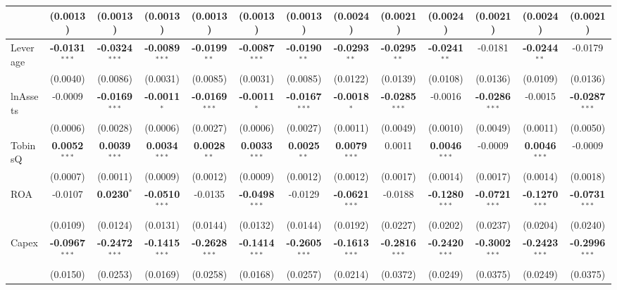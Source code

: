 \documentclass[11pt,a4paper]{article}
\begin{document}
\begin{table}[htbp]
\begin{tabular}{lcccccccccccc}
 & (0.0013) & (0.0013) & (0.0013) & (0.0013) & (0.0013) & (0.0013) & (0.0024) & (0.0021) & (0.0024) & (0.0021) & (0.0024) & (0.0021) \\
\midrule
Leverage & \textbf{-0.0131}$^{***}$ & \textbf{-0.0324}$^{***}$ & \textbf{-0.0089}$^{***}$ & \textbf{-0.0199}$^{**}$ & \textbf{-0.0087}$^{***}$ & \textbf{-0.0190}$^{**}$ & \textbf{-0.0293}$^{**}$ & \textbf{-0.0295}$^{**}$ & \textbf{-0.0241}$^{**}$ & -0.0181 & \textbf{-0.0244}$^{**}$ & -0.0179 \\
 & (0.0040) & (0.0086) & (0.0031) & (0.0085) & (0.0031) & (0.0085) & (0.0122) & (0.0139) & (0.0108) & (0.0136) & (0.0109) & (0.0136) \\
lnAssets & -0.0009 & \textbf{-0.0169}$^{***}$ & \textbf{-0.0011}$^{*}$ & \textbf{-0.0169}$^{***}$ & \textbf{-0.0011}$^{*}$ & \textbf{-0.0167}$^{***}$ & \textbf{-0.0018}$^{*}$ & \textbf{-0.0285}$^{***}$ & -0.0016 & \textbf{-0.0286}$^{***}$ & -0.0015 & \textbf{-0.0287}$^{***}$ \\
 & (0.0006) & (0.0028) & (0.0006) & (0.0027) & (0.0006) & (0.0027) & (0.0011) & (0.0049) & (0.0010) & (0.0049) & (0.0011) & (0.0050) \\
TobinsQ & \textbf{0.0052}$^{***}$ & \textbf{0.0039}$^{***}$ & \textbf{0.0034}$^{***}$ & \textbf{0.0028}$^{**}$ & \textbf{0.0033}$^{***}$ & \textbf{0.0025}$^{**}$ & \textbf{0.0079}$^{***}$ & 0.0011 & \textbf{0.0046}$^{***}$ & -0.0009 & \textbf{0.0046}$^{***}$ & -0.0009 \\
 & (0.0007) & (0.0011) & (0.0009) & (0.0012) & (0.0009) & (0.0012) & (0.0012) & (0.0017) & (0.0014) & (0.0017) & (0.0014) & (0.0018) \\
ROA & -0.0107 & \textbf{0.0230}$^{*}$ & \textbf{-0.0510}$^{***}$ & -0.0135 & \textbf{-0.0498}$^{***}$ & -0.0129 & \textbf{-0.0621}$^{***}$ & -0.0188 & \textbf{-0.1280}$^{***}$ & \textbf{-0.0721}$^{***}$ & \textbf{-0.1270}$^{***}$ & \textbf{-0.0731}$^{***}$ \\
 & (0.0109) & (0.0124) & (0.0131) & (0.0144) & (0.0132) & (0.0144) & (0.0192) & (0.0227) & (0.0202) & (0.0237) & (0.0204) & (0.0240) \\
Capex & \textbf{-0.0967}$^{***}$ & \textbf{-0.2472}$^{***}$ & \textbf{-0.1415}$^{***}$ & \textbf{-0.2628}$^{***}$ & \textbf{-0.1414}$^{***}$ & \textbf{-0.2605}$^{***}$ & \textbf{-0.1613}$^{***}$ & \textbf{-0.2816}$^{***}$ & \textbf{-0.2420}$^{***}$ & \textbf{-0.3002}$^{***}$ & \textbf{-0.2423}$^{***}$ & \textbf{-0.2996}$^{***}$ \\
 & (0.0150) & (0.0253) & (0.0169) & (0.0258) & (0.0168) & (0.0257) & (0.0214) & (0.0372) & (0.0249) & (0.0375) & (0.0249) & (0.0375) \\

\end{tabular}
\end{table}
\end{document}
